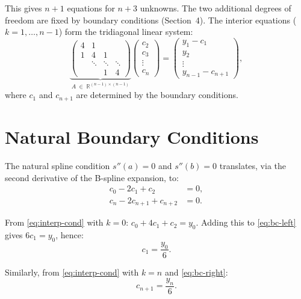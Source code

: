 \documentclass[11pt,a4paper]{article}
\begin{document}
This gives $n + 1$ equations for $n + 3$ unknowns. The two additional
degrees of freedom are fixed by boundary conditions (Section~4). The
interior equations ($k = 1, \ldots, n - 1$) form the tridiagonal linear
system:
\begin{equation}\label{eq:tridiag}
  \underbrace{\begin{pmatrix}
    4 & 1 &        &   \\
    1 & 4 & 1      &   \\
      & \ddots & \ddots & \ddots \\
      &        & 1      & 4
  \end{pmatrix}}_{A \;\in\; \mathbb{R}^{(n-1)\times(n-1)}}
  \begin{pmatrix} c_2 \\ c_3 \\ \vdots \\ c_n \end{pmatrix}
  =
  \begin{pmatrix} y_1 - c_1 \\ y_2 \\ \vdots \\ y_{n-1} - c_{n+1} \end{pmatrix},
\end{equation}
where $c_1$ and $c_{n+1}$ are determined by the boundary conditions.

\section{Natural Boundary Conditions}

The natural spline condition $s''(a) = 0$ and $s''(b) = 0$ translates,
via the second derivative of the B-spline expansion, to:
\begin{align}
  c_0 - 2c_1 + c_2       &= 0, \label{eq:bc-left} \\
  c_n - 2c_{n+1} + c_{n+2} &= 0. \label{eq:bc-right}
\end{align}

From \eqref{eq:interp-cond} with $k = 0$: $c_0 + 4c_1 + c_2 = y_0$.
Adding this to \eqref{eq:bc-left} gives $6c_1 = y_0$, hence:
\begin{equation}\label{eq:c1}
  c_1 = \frac{y_0}{6}.
\end{equation}

Similarly, from \eqref{eq:interp-cond} with $k = n$ and \eqref{eq:bc-right}:
\begin{equation}\label{eq:cn1}
  c_{n+1} = \frac{y_n}{6}.
\end{equation}
\end{document}
